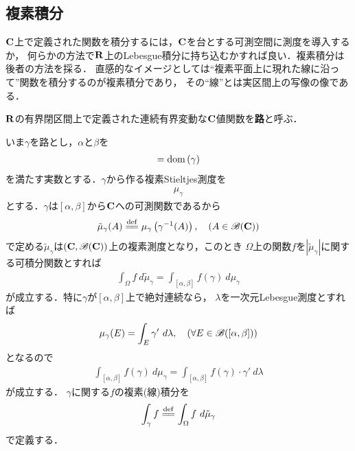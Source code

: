 \subsection{複素積分}
	
	$\mathbf{C}$上で定義された関数を積分するには，$\mathbf{C}$を台とする可測空間に測度を導入するか，
	何らかの方法で$\mathbf{R}$上のLebesgue積分に持ち込むかすれば良い．複素積分は後者の方法を採る．
	直感的なイメージとしては``複素平面上に現れた線に沿って''関数を積分するのが複素積分であり，
	その``線''とは実区間上の写像の像である．
	
	\begin{screen}
		\begin{dfn}[路]
			$\mathbf{R}$の有界閉区間上で定義された連続有界変動な$\mathbf{C}$値関数を{\bf 路}と呼ぶ．
		\end{dfn}
	\end{screen}
	
	いま$\gamma$を路とし，$\alpha$と$\beta$を
	\begin{align}
		[\alpha,\beta] = \dom{\gamma}
	\end{align}
	を満たす実数とする．$\gamma$から作る複素Stieltjes測度を
	\begin{align}
		\mu_\gamma
	\end{align}
	とする．$\gamma$は$[\alpha,\beta]$から$\mathbf{C}$への可測関数であるから
	\begin{align}
		\tilde{\mu}_\gamma(A) \defeq \mu_\gamma\left( \gamma^{-1}(A) \right),
		\quad (A \in \borel{\C})
	\end{align}
	で定める$\tilde{\mu}_\gamma$は$(\mathbf{C},\mathscr{B}(\mathbf{C}))$上の複素測度となり，このとき
	$\Omega$上の関数$f$を$|\tilde{\mu}_\gamma|$に関する可積分関数とすれば
	\begin{align}
		\int_\Omega f\ d\tilde{\mu}_\gamma = \int_{[\alpha,\beta]} f(\gamma)\ d\mu_\gamma
	\end{align}
	が成立する．特に$\gamma$が$[\alpha,\beta]$上で絶対連続なら，
	$\lambda$を一次元Lebesgue測度とすれば
	\begin{align}
		\mu_\gamma(E) = \int_E \gamma'\ d\lambda,
		\quad (\forall E \in \mathscr{B}([\alpha,\beta]))
	\end{align}
	となるので
	\begin{align}
		\int_{[\alpha,\beta]} f(\gamma)\ d\mu_\gamma = \int_{[\alpha,\beta]} f(\gamma) \cdot \gamma'\ d\lambda
	\end{align}
	が成立する．
	$\gamma$に関する$f$の複素(線)積分を
	\begin{align}
		\int_\gamma f \defeq \int_\Omega f\ d\tilde{\mu}_\gamma
	\end{align}
	で定義する．
	
